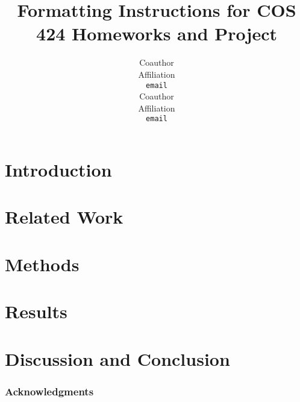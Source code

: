 \documentclass{article} %
\title{Formatting Instructions for COS 424 Homeworks and Project}
\author{
Coauthor\\
Affiliation\\
\texttt{email} \\
\And
Coauthor \\
Affiliation \\
\texttt{email} \\
}
\begin{document}
\maketitle

\begin{abstract}

\end{abstract}

\section{Introduction}

\blindtext

\section{Related Work}



\section{Methods}



\section{Results}



\section{Discussion and Conclusion}



\subsubsection*{Acknowledgments}




\end{document}
